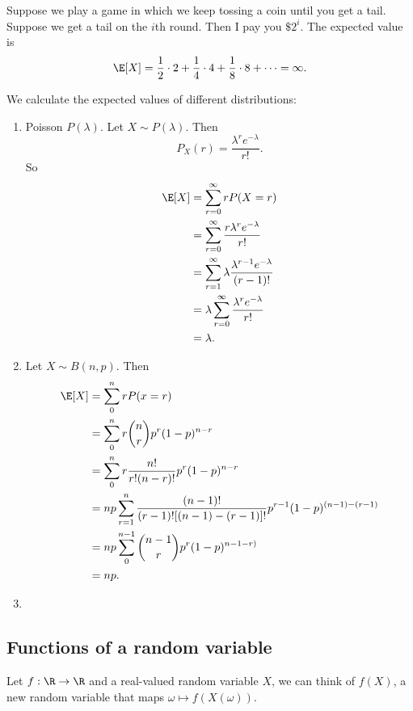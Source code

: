 \documentclass[a4paper]{article}
\begin{document}
\begin{eg}
  Suppose we play a game in which we keep tossing a coin until you get a tail. Suppose we get a tail on the $i$th round. Then I pay you $\$2^i$. The expected value is
  \[
    \E[X] = \frac{1}{2}\cdot 2 + \frac{1}{4}\cdot 4 + \frac{1}{8}\cdot 8 + \cdots = \infty.
  \]
\end{eg}

\begin{eg}
  We calculate the expected values of different distributions:
  \begin{enumerate}
    \item Poisson $P(\lambda)$. Let $X\sim P(\lambda)$. Then
      \[
        P_X(r) = \frac{\lambda^r e^{-\lambda}}{r!}.
      \]
      So
      \begin{align*}
        \E[X] &= \sum_{r = 0}^\infty rP(X = r)\\
        &= \sum_{r = 0}^\infty \frac{r \lambda^r e^{-\lambda}}{r!}\\
        &= \sum_{r = 1}^\infty \lambda \frac{\lambda^{r - 1}e^{-\lambda}}{(r - 1)!}\\
        &= \lambda\sum_{r = 0}^\infty\frac{\lambda^r e^{-\lambda}}{r!}\\
        &= \lambda. 
      \end{align*}
    \item Let $X\sim B(n, p)$. Then
      \begin{align*}
        \E[X] &= \sum_0^n rP(x = r)\\
        &= \sum_0^n r\binom{n}{r} p^r(1 - p)^{n - r}\\
        &= \sum_0^n r\frac{n!}{r!(n - r)!}p^r (1 - p)^{n - r}\\
        &= np\sum_{r = 1}^n \frac{(n - 1)!}{(r - 1)![(n - 1) - (r - 1)]!}p^{r - 1}(1 - p)^{(n - 1) - (r - 1)}\\
        &= np\sum_{0}^{n - 1}\binom{n - 1}{r}p^r(1 - p)^{n - 1 - r)}\\
        &= np.
      \end{align*}
    \item 
  \end{enumerate}
\end{eg}
\subsection{Functions of a random variable}
Let $f: \R \to \R$ and a real-valued random variable $X$, we can think of $f(X)$, a new random variable that maps $\omega \mapsto f(X(\omega))$.
\end{document}
